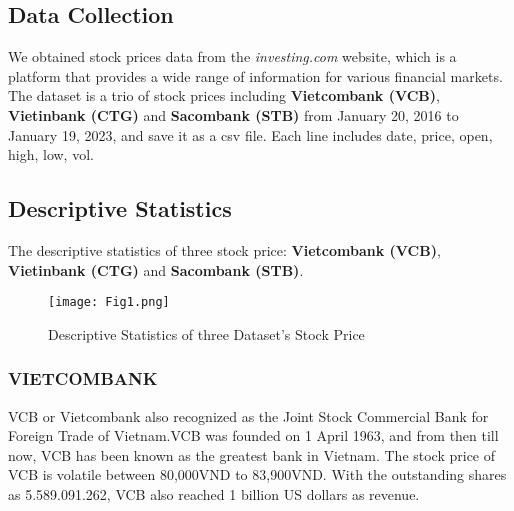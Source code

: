 \documentclass{ieeeojies}
\begin{document}
\subsection{Data Collection}
We obtained stock prices data from the \textit{investing.com} website, which is a platform that provides a wide range of information for various financial markets. The dataset is a trio of stock prices including \textbf{Vietcombank (VCB)}, \textbf{Vietinbank (CTG)} and \textbf{Sacombank (STB)} from January 20, 2016 to January 19, 2023, and save it as a csv file. Each line includes date, price, open, high, low, vol.

\begin{table}[ht]
\centering
{}
\end{table}

\subsection{Descriptive Statistics}
The descriptive statistics of three stock price: \textbf{Vietcombank (VCB)}, \textbf{Vietinbank (CTG)} and \textbf{Sacombank (STB)}.

\begin{figure}[ht]
  \centering
  \texttt{[image: Fig1.png]}
  \caption{Descriptive Statistics of three Dataset’s Stock Price}
  \label{fig:example}
\end{figure}
\subsubsection*{\textbf{VIETCOMBANK}}
VCB or Vietcombank also recognized as the Joint Stock Commercial Bank for Foreign Trade of Vietnam.VCB was founded on 1 April 1963, and from then till now, VCB has been known as the greatest bank in Vietnam. The stock price of VCB is volatile between 80,000VND to 83,900VND. With the outstanding shares as 5.589.091.262, VCB also reached 1 billion US dollars as revenue.
\end{document}
